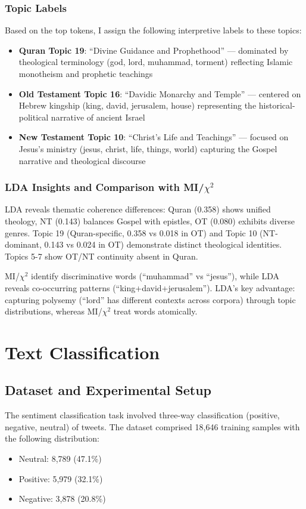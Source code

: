 \documentclass[10pt,a4paper]{article}
\begin{document}
\subsubsection{Topic Labels}
Based on the top tokens, I assign the following interpretive labels to these topics:
\begin{itemize}
    \item \textbf{Quran Topic 19}: ``Divine Guidance and Prophethood'' --- dominated by theological terminology (god, lord, muhammad, torment) reflecting Islamic monotheism and prophetic teachings
    \item \textbf{Old Testament Topic 16}: ``Davidic Monarchy and Temple'' --- centered on Hebrew kingship (king, david, jerusalem, house) representing the historical-political narrative of ancient Israel
    \item \textbf{New Testament Topic 10}: ``Christ's Life and Teachings'' --- focused on Jesus's ministry (jesus, christ, life, things, world) capturing the Gospel narrative and theological discourse
\end{itemize}

\subsubsection{LDA Insights and Comparison with MI/$\chi^2$}

LDA reveals thematic coherence differences: Quran (0.358) shows unified theology, NT (0.143) balances Gospel with epistles, OT (0.080) exhibits diverse genres. Topic 19 (Quran-specific, 0.358 vs 0.018 in OT) and Topic 10 (NT-dominant, 0.143 vs 0.024 in OT) demonstrate distinct theological identities. Topics 5-7 show OT/NT continuity absent in Quran. 

MI/$\chi^2$ identify discriminative words (``muhammad'' vs ``jesus''), while LDA reveals co-occurring patterns (``king+david+jerusalem''). LDA's key advantage: capturing polysemy (``lord'' has different contexts across corpora) through topic distributions, whereas MI/$\chi^2$ treat words atomically.

\section{Text Classification}

\subsection{Dataset and Experimental Setup}
The sentiment classification task involved three-way classification (positive, negative, neutral) of tweets. The dataset comprised 18,646 training samples with the following distribution:
\begin{itemize}
    \item Neutral: 8,789 (47.1\%)
    \item Positive: 5,979 (32.1\%)
    \item Negative: 3,878 (20.8\%)
\end{itemize}
\end{document}
